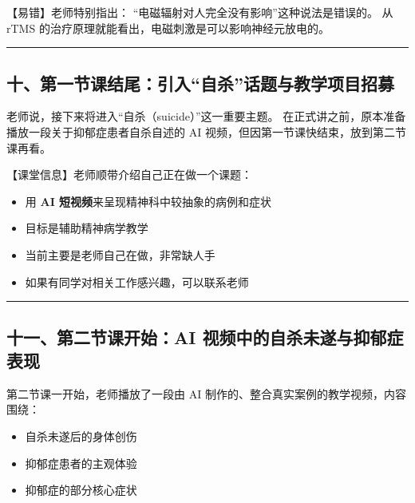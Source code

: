 \documentclass[
  chinese,
  9pt,
  a4paper,
]{ctexart}
\providecommand{\tightlist}{%
  \setlength{\itemsep}{0pt}\setlength{\parskip}{0pt}}
\begin{document}
【易错】老师特别指出： ``电磁辐射对人完全没有影响''这种说法是错误的。 从
rTMS 的治疗原理就能看出，电磁刺激是可以影响神经元放电的。

\begin{center}\rule{0.5\linewidth}{0.5pt}\end{center}

\subsection{十、第一节课结尾：引入``自杀''话题与教学项目招募}\label{ux5341ux7b2cux4e00ux8282ux8bfeux7ed3ux5c3eux5f15ux5165ux81eaux6740ux8bddux9898ux4e0eux6559ux5b66ux9879ux76eeux62dbux52df}

老师说，接下来将进入``自杀（suicide）''这一重要主题。
在正式讲之前，原本准备播放一段关于抑郁症患者自杀自述的 AI
视频，但因第一节课快结束，放到第二节课再看。

【课堂信息】老师顺带介绍自己正在做一个课题：

\begin{itemize}
\tightlist
\item
  用 \textbf{AI 短视频}来呈现精神科中较抽象的病例和症状
\item
  目标是辅助精神病学教学
\item
  当前主要是老师自己在做，非常缺人手
\item
  如果有同学对相关工作感兴趣，可以联系老师
\end{itemize}

\begin{center}\rule{0.5\linewidth}{0.5pt}\end{center}

\subsection{十一、第二节课开始：AI
视频中的自杀未遂与抑郁症表现}\label{ux5341ux4e00ux7b2cux4e8cux8282ux8bfeux5f00ux59cbai-ux89c6ux9891ux4e2dux7684ux81eaux6740ux672aux9042ux4e0eux6291ux90c1ux75c7ux8868ux73b0}

第二节课一开始，老师播放了一段由 AI
制作的、整合真实案例的教学视频，内容围绕：

\begin{itemize}
\tightlist
\item
  自杀未遂后的身体创伤
\item
  抑郁症患者的主观体验
\item
  抑郁症的部分核心症状
\end{itemize}
\end{document}
